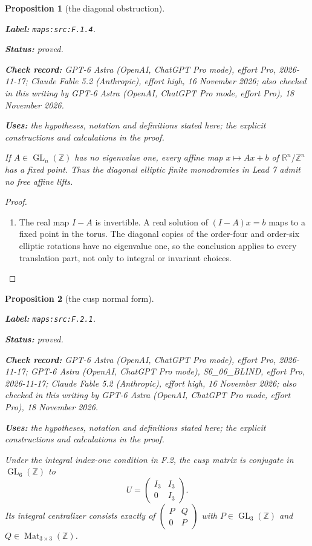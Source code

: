 \documentclass[11pt,a4paper]{article}
\newtheorem{proposition}[proposition]{Proposition}
\theoremstyle{definition}
\newcommand{\StatementRecord}[4]{\par\smallskip\begingroup\upshape\raggedright\noindent\textbf{Label:} \nolinkurl{#1}.\par\noindent\textbf{Status:} #2.\par\noindent\textbf{Check record:} #3.\par\noindent\textbf{Uses:} #4.\par\endgroup\smallskip}
\newcommand{\CurrentChecker}{GPT-6 Astra (OpenAI, ChatGPT Pro mode, effort Pro), 18 November 2026}
\begin{document}
\begin{proposition}[the diagonal obstruction]\label{maps:src:F.1.4}
\StatementRecord{maps:src:F.1.4}{proved}{GPT-6 Astra (OpenAI, ChatGPT Pro mode), effort Pro, 2026-11-17; Claude Fable 5.2 (Anthropic), effort high, 16 November 2026; also checked in this writing by \CurrentChecker}{the hypotheses, notation and definitions stated here; the explicit constructions and calculations in the proof}


If $A\in\operatorname{GL}_n(\mathbb Z)$ has no eigenvalue one,
every affine map $x\mapsto Ax+b$ of $\mathbb R^n/\mathbb Z^n$
has a fixed point.  Thus the diagonal elliptic finite monodromies
in Lead 7 admit no free affine lifts.

\end{proposition}


\begin{proof}
\begin{enumerate}[label=\arabic*.]
\item The real map $I-A$ is invertible.  A real solution of
$(I-A)x=b$ maps to a fixed point in the torus.  The diagonal
copies of the order-four and order-six elliptic rotations have
no eigenvalue one, so the conclusion applies to every translation
part, not only to integral or invariant choices.

\end{enumerate}
\end{proof}




\begin{proposition}[the cusp normal form]\label{maps:src:F.2.1}
\StatementRecord{maps:src:F.2.1}{proved}{GPT-6 Astra (OpenAI, ChatGPT Pro mode), effort Pro, 2026-11-17; GPT-6 Astra (OpenAI, ChatGPT Pro mode), S6\_06\_BLIND, effort Pro, 2026-11-17; Claude Fable 5.2 (Anthropic), effort high, 16 November 2026; also checked in this writing by \CurrentChecker}{the hypotheses, notation and definitions stated here; the explicit constructions and calculations in the proof}


Under the integral index-one condition in F.2, the cusp matrix is
conjugate in $\operatorname{GL}_6(\mathbb Z)$ to
\[
 U=\begin{pmatrix}I_3&I_3\\0&I_3\end{pmatrix}.
\]
Its integral centralizer consists exactly of
$\left(\begin{smallmatrix}P&Q\\0&P\end{smallmatrix}\right)$
with $P\in\operatorname{GL}_3(\mathbb Z)$ and
$Q\in\operatorname{Mat}_{3\times3}(\mathbb Z)$.

\end{proposition}
\end{document}
